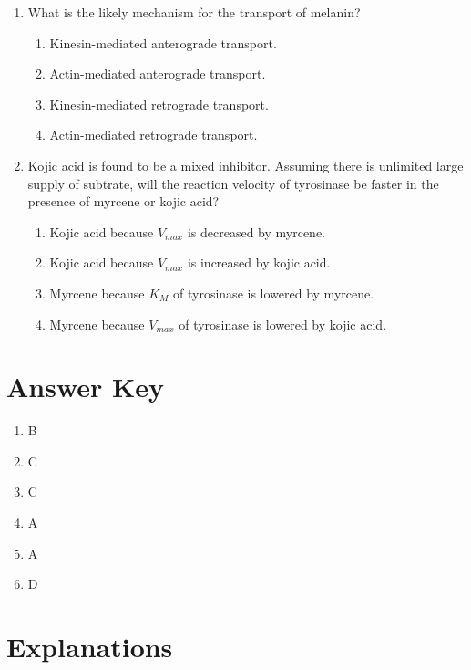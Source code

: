 \documentclass{article}
\begin{document}
\begin{enumerate}
    \item What is the likely mechanism for the transport of melanin?
    \begin{enumerate}
        \item Kinesin-mediated anterograde transport.
        \item Actin-mediated anterograde transport.
        \item Kinesin-mediated retrograde transport.
        \item Actin-mediated retrograde transport.
    \end{enumerate}

    \item Kojic acid is found to be a mixed inhibitor. Assuming there is unlimited large supply of subtrate, will the reaction velocity of tyrosinase be faster in the presence of myrcene or kojic acid?
    \begin{enumerate}
        \item Kojic acid because $V_{max}$ is decreased by myrcene.
        \item Kojic acid because $V_{max}$ is increased by kojic acid.
        \item Myrcene because $K_M$ of tyrosinase is lowered by myrcene.
        \item Myrcene because $V_{max}$ of tyrosinase is lowered by kojic acid.
    \end{enumerate}
\end{enumerate}


\pagebreak

\section*{Answer Key}

\begin{enumerate}
    \item B
    \item C
    \item C
    \item A
    \item A
    \item D
\end{enumerate}

\section*{Explanations}
\end{document}
